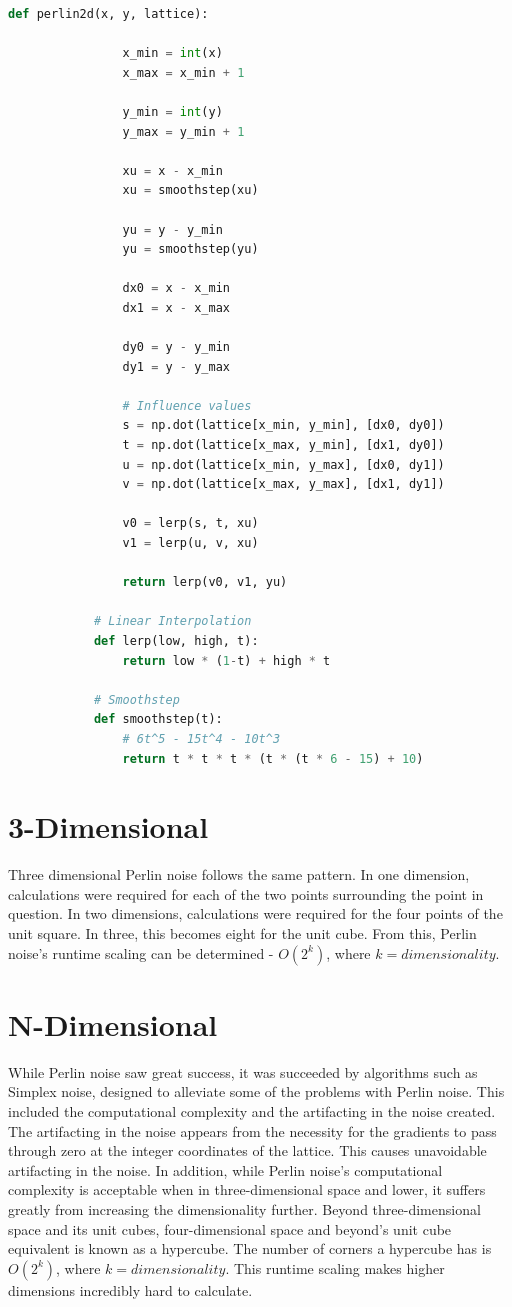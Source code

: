 \documentclass[10pt]{report}
\begin{document}
		\begin{lstlisting}[label={lst:2d-perlin}, language=Python, frame=none, caption={Two-dimensional Perlin noise.}, captionpos=b]
			def perlin2d(x, y, lattice):
			
				x_min = int(x)
				x_max = x_min + 1
				
				y_min = int(y)
				y_max = y_min + 1
				
				xu = x - x_min
				xu = smoothstep(xu)
				
				yu = y - y_min
				yu = smoothstep(yu)
				
				dx0 = x - x_min
				dx1 = x - x_max
				
				dy0 = y - y_min
				dy1 = y - y_max
				
				# Influence values
				s = np.dot(lattice[x_min, y_min], [dx0, dy0])
				t = np.dot(lattice[x_max, y_min], [dx1, dy0])
				u = np.dot(lattice[x_min, y_max], [dx0, dy1])
				v = np.dot(lattice[x_max, y_max], [dx1, dy1])
				
				v0 = lerp(s, t, xu)
				v1 = lerp(u, v, xu)
				
				return lerp(v0, v1, yu)
			
			# Linear Interpolation
			def lerp(low, high, t):
				return low * (1-t) + high * t
			
			# Smoothstep
			def smoothstep(t):
				# 6t^5 - 15t^4 - 10t^3
				return t * t * t * (t * (t * 6 - 15) + 10)
		\end{lstlisting}
		
		\section{3-Dimensional}
		
		Three dimensional Perlin noise follows the same pattern. In one dimension, calculations were required for each of the two points surrounding the point in question. In two dimensions, calculations were required for the four points of the unit square. In three, this becomes eight for the unit cube. From this, Perlin noise's runtime scaling can be determined - \(O(2^k)\), where \(k = dimensionality\). 
		
		\section{N-Dimensional}
		
		While Perlin noise saw great success, it was succeeded by algorithms such as Simplex noise, designed to alleviate some of the problems with Perlin noise. This included the computational complexity and the artifacting in the noise created. The artifacting in the noise appears from the necessity for the gradients to pass through zero at the integer coordinates of the lattice. This causes unavoidable artifacting in the noise. In addition, while Perlin noise's computational complexity is acceptable when in three-dimensional space and lower, it suffers greatly from increasing the dimensionality further. Beyond three-dimensional space and its unit cubes, four-dimensional space and beyond's unit cube equivalent is known as a hypercube. The number of corners a hypercube has is \(O(2^k)\), where \(k = dimensionality\). This runtime scaling makes higher dimensions incredibly hard to calculate. 
		
\end{document}
